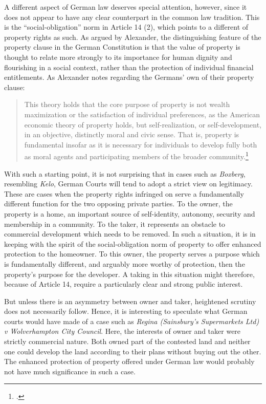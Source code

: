 {A different aspect of German law deserves special attention, however, since it does not appear to have any clear counterpart in the common law tradition. This is the  ``social-obligation'' norm in Article 14 (2), which points to a different  of property rights as such. As argued by Alexander, the distinguishing feature of the property clause in the German Constitution is that the value of property is thought to relate more strongly to its importance for human dignity and flourishing in a social context, rather than the protection of individual financial entitlements. As Alexander notes regarding the Germans' own  of their property clause:

\begin{quote}
This theory holds that the core purpose of property is not wealth maximization or the satisfaction of individual preferences, as the American economic theory of property holds, but self-realization, or self-development, in an objective, distinctly moral and civic sense. That is, property is fundamental insofar as it is necessary for individuals to develop fully both
as moral agents and participating members of the broader community.\footcite[745]{alexander03}
\end{quote}

With such a starting point, it is not surprising that in cases such as {\it Boxberg}, resembling {\it Kelo}, German Courts will tend to adopt a strict view on legitimacy. These are cases when the property rights infringed on serve a fundamentally different function for the two opposing private parties. To the owner, the property is a home, an important source of self-identity, autonomy, security and membership in a community. To the taker, it represents an obstacle to commercial development which needs to be removed. In such a situation, it is in keeping with the spirit of the social-obligation norm of property to offer enhanced protection to the homeowner. To this owner, the property serves a purpose which is fundamentally different, and arguably more worthy of protection, then the property's purpose for the developer. A taking in this situation might therefore, because of Article 14, require a particularly clear and strong public interest.

But unless there is an asymmetry between owner and taker, heightened scrutiny does not necessarily follow. Hence, it is interesting to speculate what German courts would have made of a case such as {\it Regina (Sainsbury’s Supermarkets Ltd) v Wolverhampton City Council}. Here, the interests of owner and taker were strictly commercial nature. Both owned part of the contested land and neither one could develop the land according to their plans without buying out the other. The enhanced protection of property offered under German law would probably not have much significance in such a case. 

}
